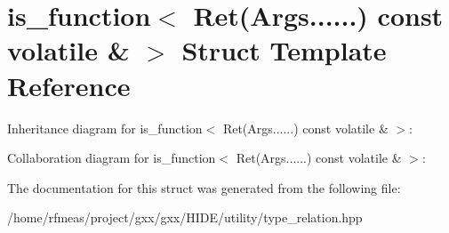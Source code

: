 \hypertarget{structis__function_3_01Ret_07Args_8_8_8_8_8_8_08_01const_01volatile_01_6_01_4}{}\section{is\+\_\+function$<$ Ret(Args......) const volatile \& $>$ Struct Template Reference}
\label{structis__function_3_01Ret_07Args_8_8_8_8_8_8_08_01const_01volatile_01_6_01_4}


Inheritance diagram for is\+\_\+function$<$ Ret(Args......) const volatile \& $>$\+:


Collaboration diagram for is\+\_\+function$<$ Ret(Args......) const volatile \& $>$\+:


The documentation for this struct was generated from the following file\+:\begin{DoxyCompactItemize}
\item 
/home/rfmeas/project/gxx/gxx/\+H\+I\+D\+E/utility/type\+\_\+relation.\+hpp\end{DoxyCompactItemize}
